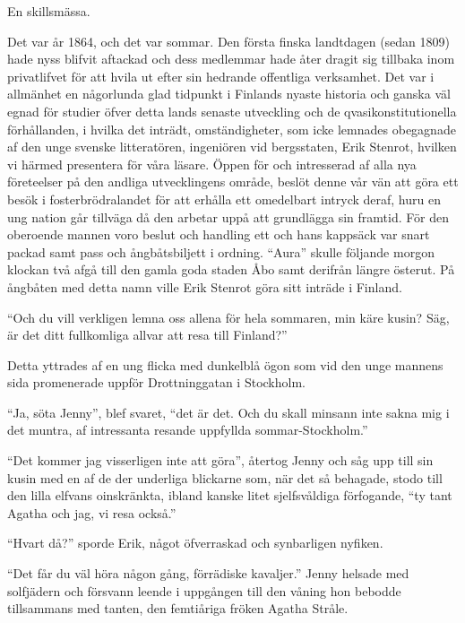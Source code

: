 En skillsmässa.

Det var år 1864, och det var sommar. Den första finska landtdagen (sedan
1809) hade nyss blifvit aftackad och dess medlemmar hade åter dragit sig
tillbaka inom privatlifvet för att hvila ut efter sin hedrande
offentliga verksamhet. Det var i allmänhet en någorlunda glad tidpunkt i
Finlands nyaste historia och ganska väl egnad för studier öfver detta
lands senaste utveckling och de qvasikonstitutionella förhållanden, i
hvilka det inträdt, omständigheter, som icke lemnades obegagnade af den
unge svenske litteratören, ingeniören vid bergsstaten, Erik Stenrot,
hvilken vi härmed presentera för våra läsare. Öppen för och intresserad
af alla nya företeelser på den andliga utvecklingens område, beslöt
denne vår vän att göra ett besök i fosterbrödralandet för att erhålla
ett omedelbart intryck deraf, huru en ung nation går tillväga då den
arbetar uppå att grundlägga sin framtid. För den oberoende mannen voro
beslut och handling ett och hans kappsäck var snart packad samt pass och
ångbåtsbiljett i ordning. ``Aura'' skulle följande morgon klockan två
afgå till den gamla goda staden Åbo samt derifrån längre österut. På
ångbåten med detta namn ville Erik Stenrot göra sitt inträde i Finland.

``Och du vill verkligen lemna oss allena för hela sommaren, min käre
kusin? Säg, är det ditt fullkomliga allvar att resa till Finland?''

Detta yttrades af en ung flicka med dunkelblå ögon som vid den unge
mannens sida promenerade uppför Drottninggatan i Stockholm.

``Ja, söta Jenny'', blef svaret, ``det är det. Och du skall minsann inte
sakna mig i det muntra, af intressanta resande uppfyllda
sommar-Stockholm.''

``Det kommer jag visserligen inte att göra'', återtog Jenny och såg upp
till sin kusin med en af de der underliga blickarne som, när det så
behagade, stodo till den lilla elfvans oinskränkta, ibland kanske litet
sjelfsvåldiga förfogande, ``ty tant Agatha och jag, vi resa också.''

``Hvart då?'' sporde Erik, något öfverraskad och synbarligen nyfiken.

``Det får du väl höra någon gång, förrädiske kavaljer.'' Jenny helsade
med solfjädern och försvann leende i uppgången till den våning hon
bebodde tillsammans med tanten, den femtiåriga fröken Agatha Stråle.

